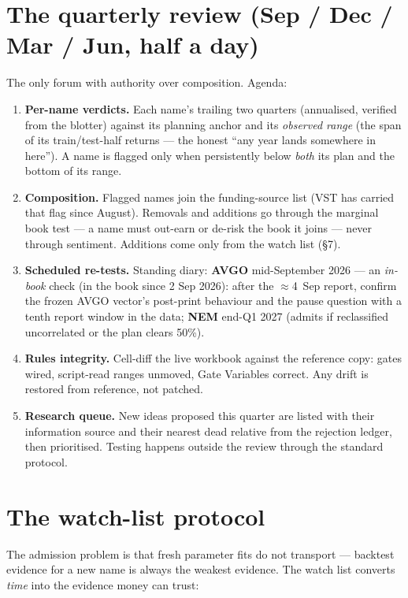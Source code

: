 \documentclass[11pt,a4paper]{article}
\begin{document}
\section{The quarterly review (Sep / Dec / Mar / Jun, half a day)}

The only forum with authority over composition. Agenda:

\begin{enumerate}[leftmargin=1.6em, itemsep=2pt]
\item \textbf{Per-name verdicts.} Each name's trailing two quarters
      (annualised, verified from the blotter) against its planning anchor
      and its \emph{observed range} (the span of its train/test-half
      returns --- the honest ``any year lands somewhere in here''). A name
      is flagged only when persistently below \emph{both} its plan and the
      bottom of its range.
\item \textbf{Composition.} Flagged names join the funding-source list (VST
      has carried that flag since August). Removals and additions go through
      the marginal book test --- a name must out-earn or de-risk the book it
      joins --- never through sentiment. Additions come only from the watch
      list (\S7).
\item \textbf{Scheduled re-tests.} Standing diary: \textbf{AVGO}
      mid-September 2026 --- an \emph{in-book} check (in the book since
      2 Sep 2026): after the $\approx$4~Sep report, confirm the frozen AVGO
      vector's post-print behaviour and the pause question with a tenth
      report window in the data; \textbf{NEM} end-Q1 2027 (admits if
      reclassified uncorrelated or the plan clears 50\%).
\item \textbf{Rules integrity.} Cell-diff the live workbook against the
      reference copy: gates wired, script-read ranges unmoved, Gate
      Variables correct. Any drift is restored from reference, not patched.
\item \textbf{Research queue.} New ideas proposed this quarter are listed
      with their information source and their nearest dead relative from the
      rejection ledger, then prioritised. Testing happens outside the review
      through the standard protocol.
\end{enumerate}

\section{The watch-list protocol}

The admission problem is that fresh parameter fits do not transport ---
backtest evidence for a new name is always the weakest evidence. The watch
list converts \emph{time} into the evidence money can trust:
\end{document}
